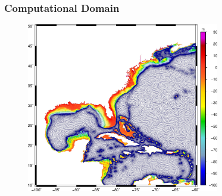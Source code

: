 \documentclass[10pt]{oden_beamer}
\begin{document}
\begin{frame}
  \frametitle{Computational Domain}
  \begin{figure}[t]
    \centering
    \includegraphics[width=0.75\textwidth]{120m_bath.jpg}
  \end{figure}
\end{frame}
\end{document}
